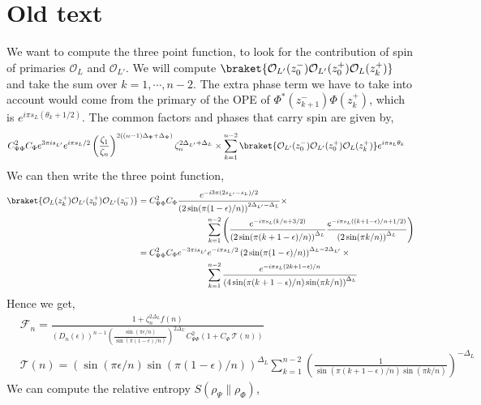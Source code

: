\documentclass[11pt]{article}
\newcommand{\ep}{\epsilon}
\newcommand{\mO}{\mathcal{O}}
\newcommand{\nn}{\nonumber}
\newcommand{\lb}{\left(}
\newcommand{\rb}{\right)}
\newcommand{\JM}[1]{\textcolor{orange}{#1}}
\begin{document}
\section{Old text}
We want to compute the three point function, to look for the contribution of spin of primaries $\mO_L$ and $\mO_{L'}$. We will compute $\braket{\mO_{L'}(z_0^-) \mO_{L'}(z_0^+) \mO_L(z_k^+)}$ and take the sum over $k =1,\cdots , n-2$. The extra phase term we have to take into account would come from the primary of the OPE of $\Phi^*(z_{k+1}^-) \Phi(z_k^+)$, which is $e^{i \pi s_L(\theta_k + 1/2)}$. The common factors and phases that carry spin are given by,
\begin{align}
    &C_{\Psi\Phi}^2C_\Phi e^{3\pi is_{L'}}e^{i\pi s_L/2}\lb\frac{\zeta_1}{\zeta_n}\rb^{2((n-1)\Delta_\Phi + \Delta_\Psi)}\zeta_n^{2\Delta_{L'} + \Delta_L}\times 
    \sum_{k=1}^{n-2}\braket{\mO_{L'}(z_0^-) \mO_{L'}(z_0^+) \mO_L(z_k^+)} e^{i \pi s_L \theta_k} 
\end{align}
We can then write the three point function,
\begin{align}
    \braket{\mO_L(z_k^+) \mO_{L'}(z_0^+)\mO_{L'}(z_0^-) } &= C_{\Psi\Phi}^2C_\Phi\frac{e^{-i3\pi (2s_{L'} -s_L)/2}}{\lb2\sin(\pi(1-\ep)/n)\rb^{2\Delta_{L'}-\Delta_L}}\times\nn \\ 
    & \qquad \qquad \qquad \qquad 
    \sum_{k=1}^{n-2}\Bigg( \frac{e^{-i\pi s_L(k/n+3/2)}}{\lb2\sin(\pi(k+1-\ep)/n)\rb^{\Delta_L}} \frac{e^{-i\pi s_L((k+1-\ep)/n+1/2)}}{\lb 2\sin(\pi k/n)\rb^{\Delta_L}}\Bigg) \nn \\
    &= C_{\Psi\Phi}^2C_\Phi e^{-3\pi is_{L'} } e^{-i\pi s_L/2}\lb 2\sin (\pi (1-\ep)/n)\rb^{\Delta_L-2\Delta_{L'}}\times \nn \\
    &\qquad \qquad \qquad \qquad \sum_{k=1}^{n-2}\frac{e^{-i\pi s_L (2k+1-\ep)/n}}{\lb  4\sin(\pi (k+1-\ep)/n)\sin(\pi k /n)\rb^{\Delta_L}} 
\end{align}
Hence we get,
\begin{align}
    &\mathcal{F}_n = \frac{1+ \zeta_n^{2\Delta_L}f(n)}{(D_n(\ep))^{n-1}\lb \frac{\sin(\pi \ep/n)}{\sin (\pi(1-\ep)/n)}\rb^{2\Delta_{L'}}C_{\Psi \Phi}^2
    \lb 1 + C_\Phi \, \mathcal{T}(n)\rb} \\
    &\mathcal{T}(n) = \lb \sin(\pi \ep/n) \sin(\pi (1-\ep)/n) \rb^{\Delta_L}\sum_{k=1}^{n-2} \lb \frac{1}{\sin(\pi (k+1-\ep)/n) \sin (\pi k /n)}\rb^{-\Delta_L}
\end{align}
We can compute the relative entropy $S(\rho_\Psi \| \rho_\Phi)$,
\end{document}
